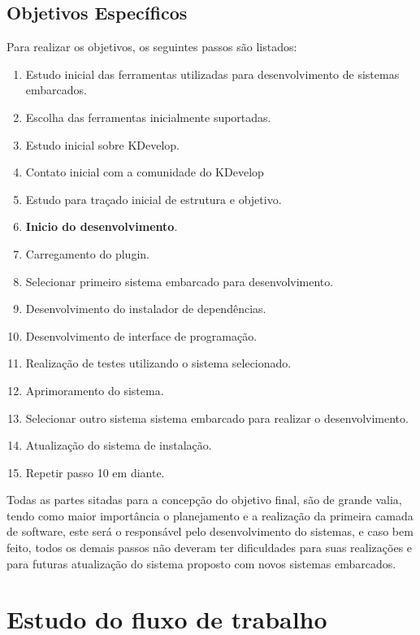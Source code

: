 \subsection{Objetivos Específicos}
\label{ss:objetivosespecificos}
Para realizar os objetivos, os seguintes passos são listados:
\begin{enumerate}
\item Estudo inicial das ferramentas utilizadas para desenvolvimento de sistemas embarcados.
\item Escolha das ferramentas inicialmente suportadas.
\item Estudo inicial sobre KDevelop.
\item Contato inicial com a comunidade do KDevelop%
\item Estudo para traçado inicial de estrutura e objetivo.
\item \textbf{Inicio do desenvolvimento}.
\item Carregamento do plugin.
\item Selecionar primeiro sistema embarcado para desenvolvimento.
\item Desenvolvimento do instalador de dependências.
\item Desenvolvimento de interface de programação.
\item Realização de testes utilizando o sistema selecionado.
\item Aprimoramento do sistema.
\item Selecionar outro sistema sistema embarcado para realizar o desenvolvimento.
\item Atualização do sistema de instalação.
\item Repetir passo 10 em diante.
\end{enumerate}

Todas as partes sitadas para a concepção do objetivo final, são de grande valia, tendo como maior importância o planejamento e a realização da primeira camada de software, este será o responsável pelo desenvolvimento do sistemas, e caso bem feito, todos os demais passos não deveram ter dificuldades para suas realizações e para futuras atualização do sistema proposto com novos sistemas embarcados.

\section{Estudo do fluxo de trabalho}

